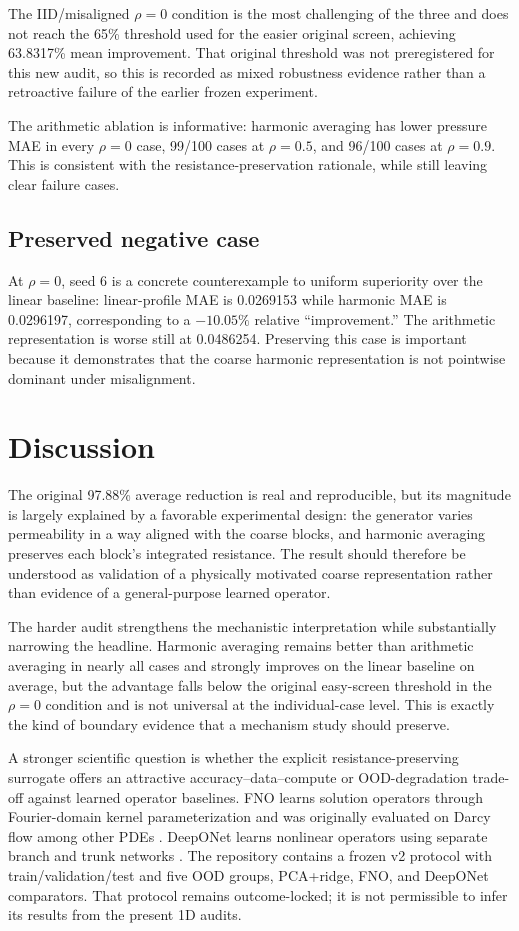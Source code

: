 \documentclass[10pt]{article}
\begin{document}
The IID/misaligned $\rho=0$ condition is the most challenging of the three and does not reach the 65\% threshold used for the easier original screen, achieving 63.8317\% mean improvement. That original threshold was not preregistered for this new audit, so this is recorded as mixed robustness evidence rather than a retroactive failure of the earlier frozen experiment.

The arithmetic ablation is informative: harmonic averaging has lower pressure MAE in every $\rho=0$ case, 99/100 cases at $\rho=0.5$, and 96/100 cases at $\rho=0.9$. This is consistent with the resistance-preservation rationale, while still leaving clear failure cases.

\subsection{Preserved negative case}
At $\rho=0$, seed 6 is a concrete counterexample to uniform superiority over the linear baseline: linear-profile MAE is 0.0269153 while harmonic MAE is 0.0296197, corresponding to a $-10.05\%$ relative ``improvement.'' The arithmetic representation is worse still at 0.0486254. Preserving this case is important because it demonstrates that the coarse harmonic representation is not pointwise dominant under misalignment.

\section{Discussion}
The original 97.88\% average reduction is real and reproducible, but its magnitude is largely explained by a favorable experimental design: the generator varies permeability in a way aligned with the coarse blocks, and harmonic averaging preserves each block's integrated resistance. The result should therefore be understood as validation of a physically motivated coarse representation rather than evidence of a general-purpose learned operator.

The harder audit strengthens the mechanistic interpretation while substantially narrowing the headline. Harmonic averaging remains better than arithmetic averaging in nearly all cases and strongly improves on the linear baseline on average, but the advantage falls below the original easy-screen threshold in the $\rho=0$ condition and is not universal at the individual-case level. This is exactly the kind of boundary evidence that a mechanism study should preserve.

A stronger scientific question is whether the explicit resistance-preserving surrogate offers an attractive accuracy--data--compute or OOD-degradation trade-off against learned operator baselines. FNO learns solution operators through Fourier-domain kernel parameterization and was originally evaluated on Darcy flow among other PDEs \cite{li2021fno}. DeepONet learns nonlinear operators using separate branch and trunk networks \cite{lu2021deeponet}. The repository contains a frozen v2 protocol with train/validation/test and five OOD groups, PCA+ridge, FNO, and DeepONet comparators. That protocol remains outcome-locked; it is not permissible to infer its results from the present 1D audits.
\end{document}
